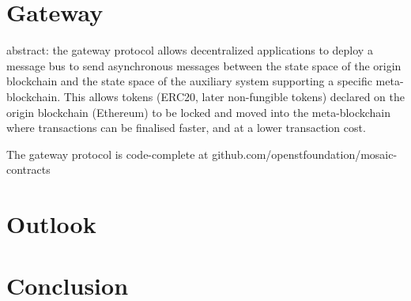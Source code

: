 \documentclass[12pt,a4paper]{article}
\begin{document}

\section{Gateway}

abstract:
the gateway protocol allows decentralized applications to deploy a message bus to send asynchronous messages between the state space of the origin blockchain and the state space of the auxiliary system supporting a specific meta-blockchain.
This allows tokens (ERC20, later non-fungible tokens) declared on the origin blockchain (Ethereum) to be locked and moved into the meta-blockchain where transactions can be finalised faster, and at a lower transaction cost. 

The gateway protocol is code-complete at github.com/openstfoundation/mosaic-contracts

%
%
\section{Outlook}

%
%
\section{Conclusion}







\end{document}
